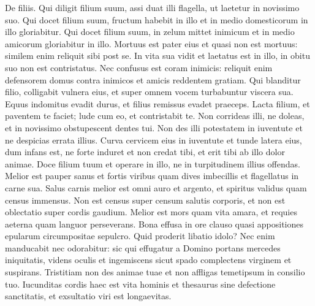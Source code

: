 \begin{biblechapter}
\begin{biblechapter}
\begin{biblechapter}
\begin{biblechapter}
\begin{biblechapter}
\begin{biblechapter}
\begin{biblechapter}
\begin{biblechapter}
\begin{biblechapter}
\begin{biblechapter}
\begin{biblechapter}
\begin{biblechapter}
\begin{biblechapter}
\begin{biblechapter}
\begin{biblechapter}
\begin{biblechapter}
\begin{biblechapter}
\begin{biblechapter}
\begin{biblechapter}
\begin{biblechapter}
\begin{biblechapter}
\begin{biblechapter}
\begin{biblechapter}
\begin{biblechapter}
\begin{biblechapter}
\begin{biblechapter}
\begin{biblechapter}
\begin{biblechapter}
\begin{biblechapter}
\begin{biblechapter}
\verse De filiis.
 Qui diligit filium suum, assi duat illi flagella,
 ut laetetur in novissimo suo.
 \verse Qui docet filium suum, fructum habebit in illo
 et in medio domesticorum in illo gloriabitur.
 \verse Qui docet filium suum, in zelum mittet inimicum
 et in medio amicorum gloriabitur in illo.
 \verse Mortuus est pater eius et quasi non est mortuus:
 similem enim reliquit sibi post se.
 \verse In vita sua vidit et laetatus est in illo,
 in obitu suo non est contristatus.
 Nec confusus est coram inimicis:
 \verse reliquit enim defensorem domus contra inimicos
 et amicis reddentem gratiam.
 \verse Qui blanditur filio, colligabit vulnera eius,
 et super omnem vocem turbabuntur viscera sua.
 \verse Equus indomitus evadit durus,
 et filius remissus evadet praeceps.
 \verse Lacta filium, et paventem te faciet;
 lude cum eo, et contristabit te.
 \verse Non corrideas illi, ne doleas,
 et in novissimo obstupescent dentes tui.
 \verse Non des illi potestatem in iuventute
 et ne despicias errata illius.
 \verse Curva cervicem eius in iuventute
 et tunde latera eius, dum infans est,
 ne forte induret et non credat tibi,
 et erit tibi ab illo dolor animae.
 \verse Doce filium tuum et operare in illo,
 ne in turpitudinem illius offendas.
 \verse Melior est pauper sanus et fortis viribus
 quam dives imbecillis et flagellatus in carne sua.
 \verse Salus carnis melior est omni auro et argento,
 et spiritus validus quam census immensus.
 \verse Non est census super censum salutis corporis,
 et non est oblectatio super cordis gaudium.
 \verse Melior est mors quam vita amara,
 et requies aeterna quam languor perseverans.
 \verse Bona effusa in ore clauso
 quasi appositiones epularum circumpositae sepulcro.
 \verse Quid proderit libatio idolo?
 Nec enim manducabit nec odorabitur:
 \verse sic qui effugatur a Domino
 portans mercedes iniquitatis,
 \verse videns oculis et ingemiscens
 sicut spado complectens virginem et suspirans.
 \verse Tristitiam non des animae tuae
 et non affligas temetipsum in consilio tuo.
 \verse Iucunditas cordis haec est vita hominis
 et thesaurus sine defectione sanctitatis,
 et exsultatio viri est longaevitas.

\end{biblechapter}
\end{biblechapter}
\end{biblechapter}
\end{biblechapter}
\end{biblechapter}
\end{biblechapter}
\end{biblechapter}
\end{biblechapter}
\end{biblechapter}
\end{biblechapter}
\end{biblechapter}
\end{biblechapter}
\end{biblechapter}
\end{biblechapter}
\end{biblechapter}
\end{biblechapter}
\end{biblechapter}
\end{biblechapter}
\end{biblechapter}
\end{biblechapter}
\end{biblechapter}
\end{biblechapter}
\end{biblechapter}
\end{biblechapter}
\end{biblechapter}
\end{biblechapter}
\end{biblechapter}
\end{biblechapter}
\end{biblechapter}
\end{biblechapter}
